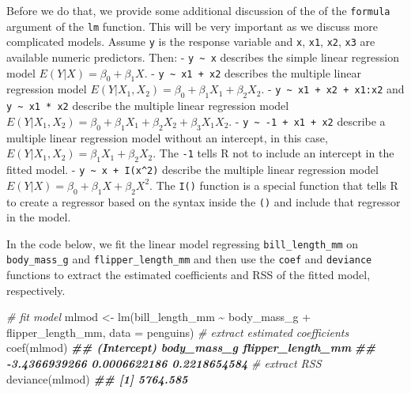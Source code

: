 \documentclass[
]{book}
\newenvironment{Shaded}{\begin{snugshade}}{\end{snugshade}}
\newcommand{\AttributeTok}[1]{\textcolor[rgb]{0.77,0.63,0.00}{#1}}
\newcommand{\CommentTok}[1]{\textcolor[rgb]{0.56,0.35,0.01}{\textit{#1}}}
\newcommand{\DocumentationTok}[1]{\textcolor[rgb]{0.56,0.35,0.01}{\textbf{\textit{#1}}}}
\newcommand{\FunctionTok}[1]{\textcolor[rgb]{0.00,0.00,0.00}{#1}}
\newcommand{\NormalTok}[1]{#1}
\newcommand{\OtherTok}[1]{\textcolor[rgb]{0.56,0.35,0.01}{#1}}
\newcommand{\SpecialCharTok}[1]{\textcolor[rgb]{0.00,0.00,0.00}{#1}}
\theoremstyle{definition}
\theoremstyle{definition}
\theoremstyle{definition}
\theoremstyle{definition}
\theoremstyle{remark}
\begin{document}
Before we do that, we provide some additional discussion of the of the \texttt{formula} argument of the \texttt{lm} function. This will be very important as we discuss more complicated models. Assume \texttt{y} is the response variable and \texttt{x}, \texttt{x1}, \texttt{x2}, \texttt{x3} are available numeric predictors. Then:
- \texttt{y\ \textasciitilde{}\ x} describes the simple linear regression model \(E(Y|X)=\beta_0+\beta_1 X\).
- \texttt{y\ \textasciitilde{}\ x1\ +\ x2} describes the multiple linear regression model \(E(Y|X_1, X_2)=\beta_0+\beta_1 X_1 + \beta_2 X_2\).
- \texttt{y\ \textasciitilde{}\ x1\ +\ x2\ +\ x1:x2} and \texttt{y\ \textasciitilde{}\ x1\ *\ x2} describe the multiple linear regression model
\(E(Y|X_1, X_2)=\beta_0+\beta_1 X_1 + \beta_2 X_2 + \beta_3 X_1 X_2\).
- \texttt{y\ \textasciitilde{}\ -1\ +\ x1\ +\ x2} describe a multiple linear regression model without an intercept, in this case,
\(E(Y|X_1, X_2)=\beta_1 X_1 + \beta_2 X_2\). The \texttt{-1} tells R not to include an intercept in the fitted model.
- \texttt{y\ \textasciitilde{}\ x\ +\ I(x\^{}2)} describe the multiple linear regression model \(E(Y|X)=\beta_0+\beta_1 X + \beta_2 X^2\). The \texttt{I()} function is a special function that tells R to create a regressor based on the syntax inside the \texttt{()} and include that regressor in the model.

In the code below, we fit the linear model regressing \texttt{bill\_length\_mm} on \texttt{body\_mass\_g} and \texttt{flipper\_length\_mm} and then use the \texttt{coef} and \texttt{deviance} functions to extract the estimated coefficients and RSS of the fitted model, respectively.

\begin{Shaded}
\begin{Highlighting}[]
\CommentTok{\# fit model}
\NormalTok{mlmod }\OtherTok{\textless{}{-}} \FunctionTok{lm}\NormalTok{(bill\_length\_mm }\SpecialCharTok{\textasciitilde{}}\NormalTok{ body\_mass\_g }\SpecialCharTok{+}\NormalTok{ flipper\_length\_mm, }\AttributeTok{data =}\NormalTok{ penguins)}
\CommentTok{\# extract estimated coefficients}
\FunctionTok{coef}\NormalTok{(mlmod)}
\DocumentationTok{\#\#       (Intercept)       body\_mass\_g flipper\_length\_mm }
\DocumentationTok{\#\#     {-}3.4366939266      0.0006622186      0.2218654584}
\CommentTok{\# extract RSS}
\FunctionTok{deviance}\NormalTok{(mlmod)}
\DocumentationTok{\#\# [1] 5764.585}
\end{Highlighting}
\end{Shaded}
\end{document}

